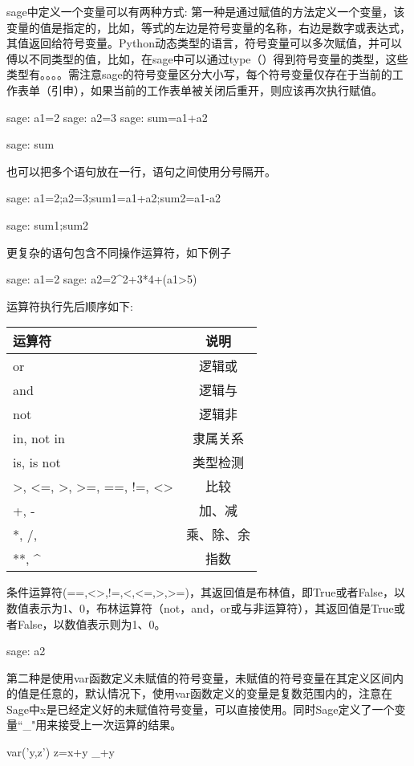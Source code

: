 \documentclass[a4paper]{article}
\begin{document}
\begin{multicols}{2}
sage中定义一个变量可以有两种方式:
第一种是通过赋值的方法定义一个变量，该变量的值是指定的，比如，等式的左边是符号变量的名称，右边是数字或表达式，其值返回给符号变量。Python动态类型的语言，符号变量可以多次赋值，并可以傅以不同类型的值，比如，在sage中可以通过type（）得到符号变量的类型，这些类型有。。。。需注意sage的符号变量区分大小写，每个符号变量仅存在于当前的工作表单（引申），如果当前的工作表单被关闭后重开，则应该再次执行赋值。
\begin{sageblock}
sage: a1=2
sage: a2=3
sage: sum=a1+a2
\end{sageblock}
\begin{sageblock}
sage: sum
\end{sageblock}
也可以把多个语句放在一行，语句之间使用分号隔开。
\begin{sageblock}
sage: a1=2;a2=3;sum1=a1+a2;sum2=a1-a2
\end{sageblock}
\begin{sageblock}
sage: sum1;sum2
\end{sageblock}
更复杂的语句包含不同操作运算符，如下例子
\begin{sageblock}
sage: a1=2
sage: a2=2^2+3*4+(a1>5)
\end{sageblock}

运算符执行先后顺序如下: \\

\begin{tabular}{lc}
	运算符	 &  	说明\\ \hline
	or		 &  逻辑或\\ \hline
	and	& 逻辑与	  \\ \hline
	not		 &  逻辑非\\ \hline
	in, not in		 & 隶属关系 \\ \hline
	is, is not		 &  类型检测\\ \hline
	>, <=, >, >=, ==, !=, <>	 & 比较 \\ \hline
	+, -	 &  加、减\\ \hline
	*, /, \percent		 & 乘、除、余 \\ \hline
	**, \^{}	 & 指数 \\
	\hline 
	\end{tabular} 
条件运算符(==,<>,!=,<,<=,>,>=)，其返回值是布林值，即True或者False，以数值表示为1、0，布林运算符（not，and，or或与非运算符），其返回值是True或者False，以数值表示则为1、0。

\begin{sageblock}
sage: a2 
\end{sageblock} 
第二种是使用var函数定义未赋值的符号变量，未赋值的符号变量在其定义区间内的值是任意的，默认情况下，使用var函数定义的变量是复数范围内的，注意在Sage中x是已经定义好的未赋值符号变量，可以直接使用。同时Sage定义了一个变量``\_"用来接受上一次运算的结果。
\begin{sageblock}
var('y,z') %
z=x+y
_+y
\end{sageblock}


\end{multicols}
\end{document}
